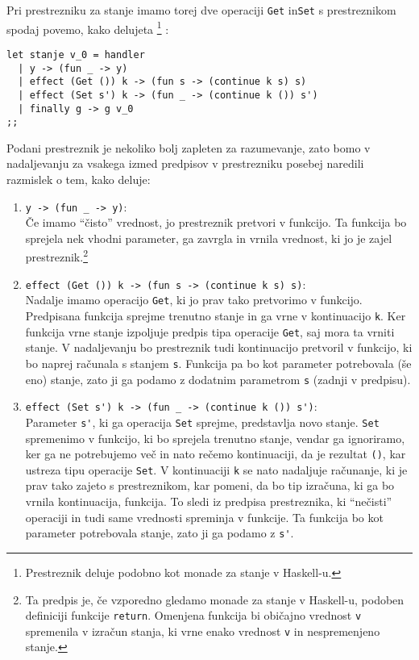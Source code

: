 \documentclass[a4paper,12pt]{article}
\theoremstyle{definition} %
\begin{document}
Pri prestrezniku za stanje imamo torej dve operaciji \lstinline{Get} in\lstinline{Set} s prestreznikom spodaj povemo, kako delujeta \footnote{Prestreznik deluje podobno kot monade za stanje v Haskell-u.} \cite{examples}:
 \begin{lstlisting}
let stanje v_0 = handler
  | y -> (fun _ -> y)
  | effect (Get ()) k -> (fun s -> (continue k s) s)
  | effect (Set s') k -> (fun _ -> (continue k ()) s')
  | finally g -> g v_0
;;
\end{lstlisting}
Podani prestreznik je nekoliko bolj zapleten za razumevanje, zato bomo v nadaljevanju za vsakega izmed predpisov v prestrezniku posebej naredili razmislek o tem, kako deluje:
\begin{enumerate}
\item \lstinline{y -> (fun _ -> y)}: \\ Če imamo "`čisto"' vrednost, jo prestreznik pretvori v funkcijo. Ta funkcija bo sprejela nek vhodni parameter, ga zavrgla in vrnila vrednost, ki jo je zajel prestreznik.\footnote{Ta predpis je, če vzporedno gledamo monade za stanje v Haskell-u, podoben definiciji funkcije \lstinline{return}. Omenjena funkcija bi običajno vrednost \lstinline{v} spremenila v izračun stanja, ki vrne enako vrednost \lstinline{v} in nespremenjeno stanje.} 

\item \lstinline{effect (Get ()) k -> (fun s -> (continue k s) s)}: \\ Nadalje imamo operacijo \lstinline{Get}, ki jo prav tako pretvorimo v funkcijo. Predpisana funkcija sprejme trenutno stanje in ga vrne v kontinuacijo \lstinline{k}. Ker funkcija vrne stanje izpoljuje predpis tipa operacije \lstinline{Get}, saj mora ta vrniti stanje. V nadaljevanju bo prestreznik tudi kontinuacijo pretvoril v funkcijo, ki bo naprej računala s stanjem \lstinline{s}. Funkcija pa bo kot parameter potrebovala (še eno) stanje, zato ji ga podamo z dodatnim parametrom \lstinline{s} (zadnji v predpisu).

\item \lstinline{effect (Set s') k -> (fun _ -> (continue k ()) s')}: \\ Parameter \lstinline{s'}, ki ga operacija \lstinline{Set} sprejme, predstavlja novo stanje. \lstinline{Set} spremenimo v funkcijo, ki bo sprejela trenutno stanje, vendar ga ignoriramo, ker ga ne potrebujemo več in nato rečemo kontinuaciji, da je rezultat \lstinline{()}, kar ustreza tipu operacije \lstinline{Set}. V kontinuaciji \lstinline{k} se nato nadaljuje računanje, ki je prav tako zajeto s prestreznikom, kar pomeni, da bo tip izračuna, ki ga bo vrnila kontinuacija, funkcija. To sledi iz predpisa prestreznika, ki "`nečisti"' operaciji in tudi same vrednosti spreminja v funkcije. Ta funkcija bo kot parameter potrebovala stanje, zato ji ga podamo z \lstinline{s'}.


\end{enumerate}
\end{document}

